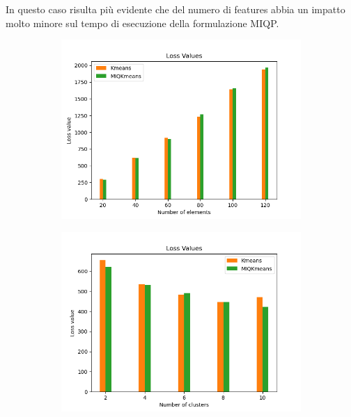 \documentclass{article}
\begin{document}
    In questo caso risulta più evidente che del numero di features abbia un impatto molto minore sul tempo di esecuzione della formulazione MIQP.\\
    \begin{figure}[h]
     \begin{subfigure}{0.32\linewidth}
         \includegraphics[width=\linewidth]{../results/log_plots/loss_size_sint2}
     \end{subfigure}%
     \begin{subfigure}{0.32\linewidth}
         \includegraphics[width=\linewidth]{../results/log_plots/loss_centers_sint2}
     \end{subfigure}%
     \begin{subfigure}{0.32\linewidth}

\end{subfigure}
\end{figure}
\end{document}
